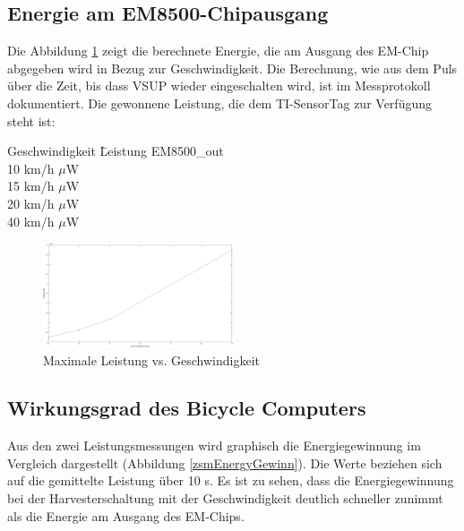 \subsection{Energie am EM8500-Chipausgang}

Die Abbildung \ref{energie_resultat_harvester} zeigt die berechnete Energie, die am Ausgang des EM-Chip abgegeben wird in Bezug zur Geschwindigkeit. Die Berechnung, wie aus dem Puls über die Zeit, bis dass VSUP wieder eingeschalten wird, ist im  Messprotokoll \cite{messung_emausgang_finish} dokumentiert. Die gewonnene Leistung, die dem TI-SensorTag zur Verfügung steht ist:


\begin{minipage}{\textwidth}
    \label{res_em_aus}
    \begin{tabbing}
        Geschwindigkeit \quad\= Leistung EM8500\_out \\[0.8ex]
        10 km/h     $\mu$W\\
        15 km/h    $\mu$W\\
        20 km/h    $\mu$W\\
        40 km/h   $\mu$W\\
    \end{tabbing}
\end{minipage}


\begin{figure}[ht]
    \includegraphics[width=0.5\textwidth]{4Resultate/imag/ResultatLeistungGeschwindigkeit.png} 
    \caption{Maximale Leistung vs. Geschwindigkeit}
    \label{energie_resultat_harvester}
\end{figure}

\subsection{Wirkungsgrad des Bicycle Computers}

Aus den zwei Leistungsmessungen wird graphisch die Energiegewinnung im Vergleich dargestellt (Abbildung \ref{zsmEnergyGewinn}). Die Werte beziehen sich auf die gemittelte Leistung über 10 s. Es ist zu sehen, dass die Energiegewinnung bei der Harvesterschaltung mit der Geschwindigkeit deutlich schneller zunimmt als die Energie am Ausgang des EM-Chips. 

